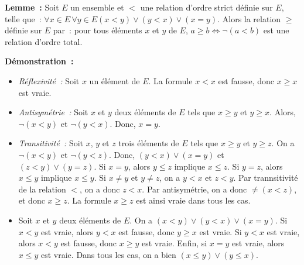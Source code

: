 \done

\medskip

\noindent\textbf{Lemme :} Soit $E$ un ensemble et $<$ une relation d'ordre strict définie sur $E$, telle que : $\forall x \in E \, \forall y \in E (x < y) \vee (y < x) \vee (x = y)$. 
    Alors la relation $\geq$ définie sur $E$ par : pour tous éléments $x$ et $y$ de $E$, $a \geq b \Leftrightarrow \neg (a < b)$ est une relation d'ordre total. 

\medskip

\noindent\textbf{Démonstration :} 
\begin{itemize}[nosep]
    \item \textit{Réflexivité :} Soit $x$ un élément de $E$. 
        La formule $x < x$ est fausse, donc $x \geq x$ est vraie. 
    \item \textit{Antisymétrie :} Soit $x$ et $y$ deux éléments de $E$ tels que $x \geq y$ et $y \geq x$. 
        Alors, $\neg (x < y)$ et $\neg (y < x)$. 
        Donc, $x = y$.
    \item \textit{Transitivité :} Soit $x$, $y$ et $z$ trois éléments de $E$ tels que $x \geq y$ et $y \geq z$. 
        On a $\neg (x < y)$ et $\neg (y < z)$. 
        Donc, $(y < x) \vee (x = y)$ et $(z < y) \vee (y = z)$. 
        Si $x = y$, alors $y \leq z$ implique $x \leq z$.
        Si $y = z$, alors $x \leq y$ implique $x \leq y$.
        Si $x \neq y$ et $y \neq z$, on a $y < x$ et $z < y$. 
        Par trannsitivité de la relation $<$, on a donc $z < x$. 
        Par antisymétrie, on a donc $\neq (x < z)$, et donc $x \geq z$. 
        La formule $x \geq z$ est ainsi vraie dans tous les cas. 
    \item Soit $x$ et $y$ deux éléments de $E$. 
        On a $(x < y) \vee (y < x) \vee (x = y)$. 
        Si $x < y$ est vraie, alors $y < x$ est fausse, donc $y \geq x$ est vraie.
        Si $y < x$ est vraie, alors $x < y$ est fausse, donc $x \geq y$ est vraie.
        Enfin, si $x = y$ est vraie, alors $x \leq y$ est vraie. 
        Dans tous les cas, on a bien $(x \leq y) \vee (y \leq x)$.
\end{itemize}

\medskip

